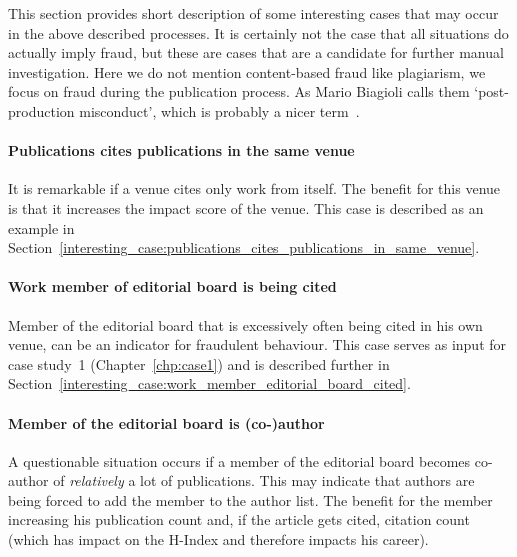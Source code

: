 \documentclass{ou-report}
\newcommand{\outline}[1]{{\color{blue} #1}}
\begin{document}
This section provides short description of some interesting cases that may 
occur in the above described processes.
It is certainly not the case that all situations do actually imply fraud, but 
these are cases that are a candidate for further manual investigation.
Here we do not mention content-based fraud like plagiarism, we focus on fraud
during the publication process. As Mario Biagioli calls them `post-production 
misconduct', which is probably a nicer term~\cite{biagioli2020gaming}.

\paragraph{Publications cites publications in the same venue} It is remarkable
if a venue cites only work from itself. The benefit for this venue is that it
increases the impact score of the venue. This case is described as an example in 
Section~\ref{interesting_case:publications_cites_publications_in_same_venue}.
\paragraph{Work member of editorial board is being cited} Member of the
editorial board that is excessively often being cited in his own venue, can be
an indicator for fraudulent behaviour. This case serves as input for case 
study~1 (Chapter~\ref{chp:case1}) and is described further in 
Section~\ref{interesting_case:work_member_editorial_board_cited}.
\paragraph{Member of the editorial board is (co-)author} 
A questionable situation occurs if a member of the editorial board becomes co-
author of \textit{relatively} a lot of publications. This may indicate that 
authors are being forced to add the member to the author list. The benefit for
the member increasing his publication count and, if the article gets cited, 
citation count (which has impact on the H-Index and therefore impacts his 
career).
\end{document}
